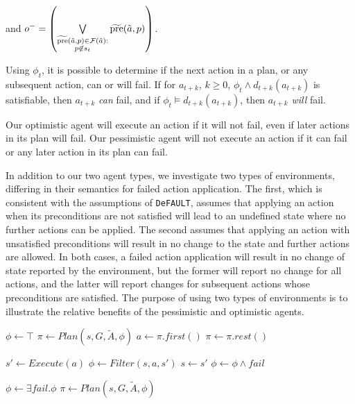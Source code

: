 \documentclass{article}
\def\FFRISKY{{\tt DeFAULT}}
\begin{document}
\noindent and 
$o^- = \left(\bigvee\limits_{\substack{\widetilde{\text{pre}}(\tilde{a},p) \in {\cal F}(\tilde{a}):\\ p \not\in s_t} } \widetilde{\text{pre}}(\tilde{a},p)  \right)$.

Using $\phi_t$, it is possible to determine if the next action in a plan, or any subsequent action, can or will fail.  If  for $a_{t+k}$, $k \geq 0$, $\phi_t \wedge d_{t+k}(a_{t+k})$ is satisfiable, then $a_{t+k}$ {\em can} fail, and if $\phi_t \models d_{t+k}(a_{t+k})$, then $a_{t+k}$ {\em will}  fail.

Our optimistic agent will execute an action if it will not fail, even if later actions in its plan will fail.  Our pessimistic agent will not execute an action if it can fail or any later action in its plan can fail.  

In addition to our two agent types, we investigate two types of environments, differing in their semantics for failed action application.  The first, which is consistent with the assumptions of \FFRISKY{}, assumes that applying an action when its preconditions are not satisfied will lead to an undefined state where no further actions can be applied.  The second assumes that applying an action with unsatisfied preconditions will result in no change to the state and further actions are allowed.  In both cases, a failed action application will result in no change of state reported by the environment, but the former will report no change for all actions, and the latter will report changes for subsequent actions whose preconditions are satisfied.  The purpose of using two types of environments is to illustrate the relative benefits of the pessimistic and optimistic agents.

\begin{algorithm}
\caption{$OptimisticAgent(s, G, \tilde{A})$}\label{alg:replan}
\begin{algorithmic}
\STATE $\phi \gets \top$
\STATE $\pi \gets Plan(s, G, \tilde{A}, \phi)$
\STATE $a \gets \pi.first()$
\STATE $\pi \gets \pi.rest()$

	\STATE $s ' \gets Execute(a)$
	\STATE $\phi \gets Filter(s, a, s')$
	\STATE $s \gets s'$
\ELSE
	\STATE $\phi \gets \phi \wedge fail$
\ENDIF

	\STATE $\phi \gets \exists fail . \phi$
	\STATE $\pi \gets Plan(s, G, \tilde{A}, \phi)$
\ENDIF
\ENDWHILE
\end{algorithmic}
\end{algorithm}
\end{document}
